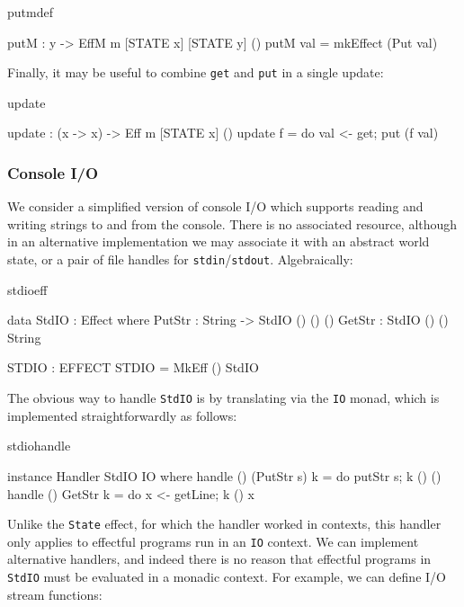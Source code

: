 \begin{SaveVerbatim}{putmdef}

putM : y -> EffM m [STATE x] [STATE y] ()
putM val = mkEffect (Put val)

\end{SaveVerbatim}

\noindent
Finally, it may be useful to combine \texttt{get} and \texttt{put} in a single
update:

\begin{SaveVerbatim}{update}

update : (x -> x) -> Eff m [STATE x] ()
update f = do val <- get; put (f val) 
\end{SaveVerbatim}

\subsubsection{Console I/O}

We consider a simplified version of console I/O which supports reading
and writing strings to and from the console. There is no associated resource,
although in an alternative implementation we may associate it with an abstract
world state, or a pair of file handles for \texttt{stdin}/\texttt{stdout}.
Algebraically:

\begin{SaveVerbatim}{stdioeff}

data StdIO : Effect where
     PutStr : String -> StdIO () () ()
     GetStr : StdIO () () String

STDIO : EFFECT
STDIO = MkEff () StdIO

\end{SaveVerbatim}

\noindent
The obvious way to handle \texttt{StdIO} is by translating via the \texttt{IO}
monad, which is implemented straightforwardly as follows:

\begin{SaveVerbatim}{stdiohandle}

instance Handler StdIO IO where
    handle () (PutStr s) k = do putStr s; k () ()
    handle () GetStr     k = do x <- getLine; k () x 

\end{SaveVerbatim}

\noindent
Unlike the \texttt{State} effect, for which the handler worked in 
contexts, this handler only applies to effectful programs run in an \texttt{IO}
context. We can implement alternative handlers, and indeed there is no
reason that effectful programs in \texttt{StdIO} must be evaluated in a monadic
context. For example, we can define I/O stream functions:


